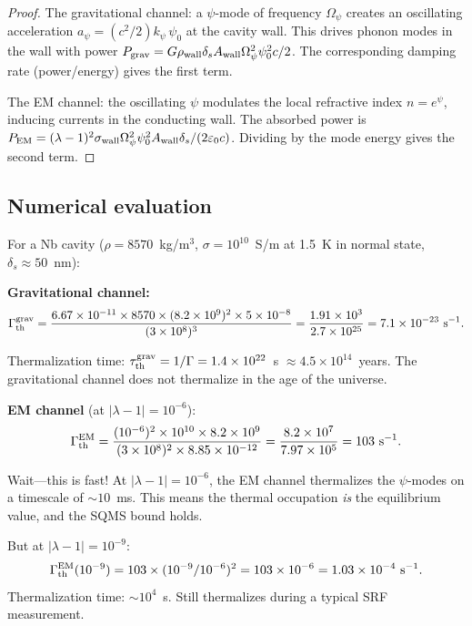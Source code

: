 \documentclass[11pt]{article}
\newcommand{\ee}[1]{\times 10^{#1}}
\newcommand{\Opsi}{\Omega_\psi}
\newcommand{\lam}{\lambda}
\begin{document}
\begin{proof}
The gravitational channel: a $\psi$-mode of frequency $\Opsi$
creates an oscillating acceleration $a_\psi = (c^2/2)k_\psi\,\psi_0$
at the cavity wall. This drives phonon modes in the wall with
power $P_{\rm grav} = G\rho_{\rm wall}\delta_s A_{\rm wall}
\Opsi^2\psi_0^2 c/2$. The corresponding damping rate
(power/energy) gives the first term.

The EM channel: the oscillating $\psi$ modulates the local
refractive index $n = e^\psi$, inducing currents in the
conducting wall. The absorbed power is
$P_{\rm EM} = (\lam-1)^2\sigma_{\rm wall}\Opsi^2\psi_0^2
A_{\rm wall}\delta_s/(2\varepsilon_0 c)$. Dividing by the
mode energy gives the second term.
\end{proof}

\subsection{Numerical evaluation}

For a Nb cavity ($\rho = 8570$~kg/m$^3$,
$\sigma = 10^{10}$~S/m at 1.5~K in normal state,
$\delta_s \approx 50$~nm):

\textbf{Gravitational channel:}
\begin{equation}
\Gamma_{\rm th}^{\rm grav} = \frac{6.67\ee{-11} \times 8570
\times (8.2\ee{9})^2 \times 5\ee{-8}}{(3\ee{8})^3}
= \frac{1.91\ee{3}}{2.7\ee{25}} = 7.1\ee{-23}\text{ s}^{-1}.
\end{equation}

Thermalization time: $\tau_{\rm th}^{\rm grav} = 1/\Gamma = 1.4\ee{22}$~s
$\approx 4.5\ee{14}$~years. The gravitational channel does not thermalize
in the age of the universe.

\textbf{EM channel} (at $|\lam-1| = 10^{-6}$):
\begin{equation}
\Gamma_{\rm th}^{\rm EM} = \frac{(10^{-6})^2 \times 10^{10}
\times 8.2\ee{9}}{(3\ee{8})^2 \times 8.85\ee{-12}}
= \frac{8.2\ee{7}}{7.97\ee{5}} = 103\text{ s}^{-1}.
\end{equation}

Wait---this is fast! At $|\lam-1| = 10^{-6}$, the EM channel
thermalizes the $\psi$-modes on a timescale of $\sim 10$~ms.
This means the thermal occupation \emph{is} the equilibrium value,
and the SQMS bound holds.

But at $|\lam-1| = 10^{-9}$:
\begin{equation}
\Gamma_{\rm th}^{\rm EM}(10^{-9}) = 103 \times (10^{-9}/10^{-6})^2
= 103 \times 10^{-6} = 1.03\ee{-4}\text{ s}^{-1}.
\end{equation}
Thermalization time: $\sim 10^4$~s. Still thermalizes during a
typical SRF measurement.
\end{document}
